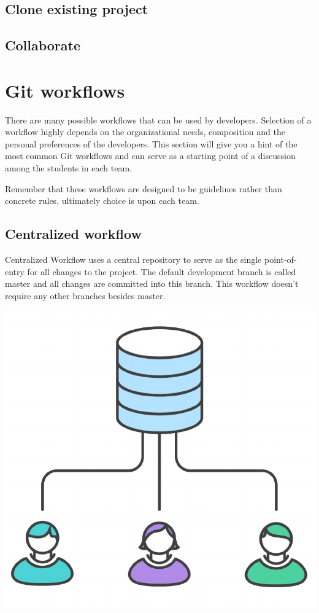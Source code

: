 \documentclass{article}
\begin{document}
\subsection{Clone existing project}

\subsection{Collaborate}


\section{Git workflows}

There are many possible workflows that can be used by
developers. Selection of a workflow highly depends on the
organizational needs, composition and the personal preferences of the
developers. This section will give you a hint of the most common Git
workflows and can serve as a starting point of a discussion among
the students in each team.  

Remember that these workflows are designed to be guidelines rather
than concrete rules, ultimately choice is upon each team.

\subsection{Centralized workflow}

Centralized Workflow uses a central repository to serve as the single
point-of-entry for all changes to the project. The
default development branch is called master and all changes are
committed into this branch. This workflow doesn't require any other
branches besides master. 

\begin{center}
\includegraphics[scale=0.5]{figures/12.pdf}
\end{center}
\end{document}
